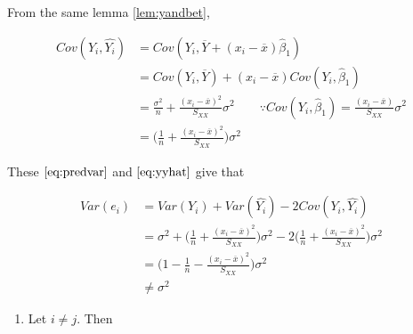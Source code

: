 \documentclass[]{book}
\providecommand{\tightlist}{%
  \setlength{\itemsep}{0pt}\setlength{\parskip}{0pt}}
\theoremstyle{definition}
\theoremstyle{definition}
\theoremstyle{definition}
\theoremstyle{remark}
\begin{document}
From the same lemma \ref{lem:yandbet},

\begin{equation} \label{eq:yyhat}
  \begin{split}
    Cov(Y_i, \hat{Y_i}) & = Cov(Y_i, \overline{Y} + (x_i - \overline{x}) \hat\beta_1) \\
    & = Cov(Y_i, \overline{Y}) + (x_i - \overline{x}) Cov(Y_i, \hat\beta_1) \\
    & = \frac{\sigma^2}{n} + \frac{(x_i - \overline{x})^2}{S_{XX}}\sigma^2 \qquad \because Cov(Y_i, \hat\beta_1) = \frac{(x_i - \overline{x})}{S_{XX}}\sigma^2 \\
    & = \bigg( \frac{1}{n} + \frac{(x_i - \overline{x})^2}{S_{XX}} \bigg)\sigma^2
  \end{split}
\end{equation}

These \(\eqref{eq:predvar}\) and \(\eqref{eq:yyhat}\) give that

\begin{equation*}
  \begin{split}
    Var(e_i) & = Var(Y_i) + Var(\hat{Y_i}) -2Cov(Y_i, \hat{Y_i}) \\
    & = \sigma^2 + \bigg( \frac{1}{n} + \frac{(x_i - \overline{x})^2}{S_{XX}} \bigg)\sigma^2 - 2 \bigg( \frac{1}{n} + \frac{(x_i - \overline{x})^2}{S_{XX}} \bigg)\sigma^2 \\
    & = \bigg(1 - \frac{1}{n} - \frac{(x_i - \overline{x})^2}{S_{XX}} \bigg)\sigma^2 \\
    & \neq \sigma^2
  \end{split}
\end{equation*}

\begin{enumerate}
\def\labelenumi{(\alph{enumi})}
\setcounter{enumi}{2}
\tightlist
\item
  Let \(i \neq j\). Then
\end{enumerate}
\end{document}
